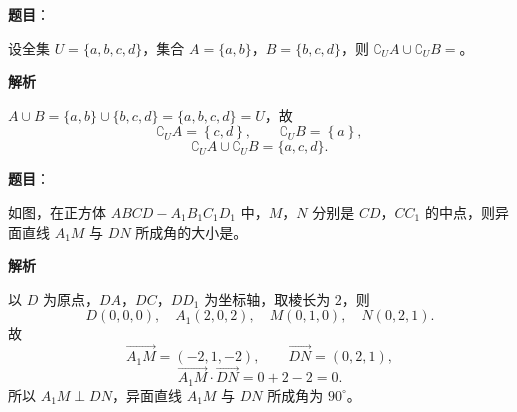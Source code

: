 \begin{answer}

\textbf{题目}：

设全集 $U=\{a,b,c,d\}$，集合 $A=\{a,b\}$，$B=\{b,c,d\}$，则 $\complement_U A\cup\complement_U B=$\gkblank{}。

\textbf{解析}

$A\cup B=\{a,b\}\cup\{b,c,d\}=\{a,b,c,d\}=U$，故
\nopagebreak[4]
\[\complement_UA=\left\{c,d\right\},\qquad \complement_UB=\left\{a\right\},\]
\nopagebreak[4]
\[\complement_UA\cup\complement_UB=\{a,c,d\}.\]


\end{answer}
\begin{answer}

\textbf{题目}：

如图，在正方体 $ABCD-A_1B_1C_1D_1$ 中，$M$，$N$ 分别是 $CD$，$CC_1$ 的中点，则异面直线 $A_1M$ 与 $DN$ 所成角的大小是\gkblank{}。
\nopagebreak[4]
\begin{center}\end{center}
\nopagebreak[4]
\textbf{解析}

以 $D$ 为原点，$DA$，$DC$，$DD_1$ 为坐标轴，取棱长为 $2$，则
\nopagebreak[4]
\[D(0,0,0),\quad A_1(2,0,2),\quad M(0,1,0),\quad N(0,2,1).\]
故
\nopagebreak[4]
\[\overrightarrow{A_1M}=(-2,1,-2),\qquad \overrightarrow{DN}=(0,2,1),\]
\nopagebreak[4]
\[\overrightarrow{A_1M}\cdot\overrightarrow{DN}=0+2-2=0.\]
所以 $A_1M\perp DN$，异面直线 $A_1M$ 与 $DN$ 所成角为 $90^\circ$。


\end{answer}
